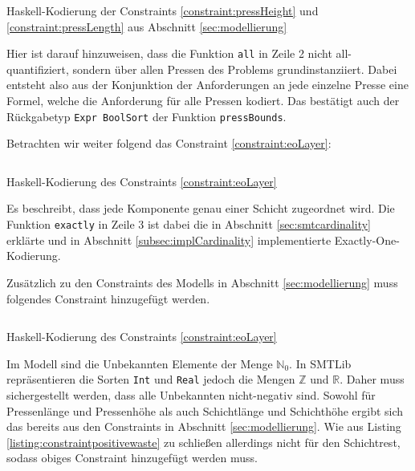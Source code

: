 \begin{listing}[H]
    \inputminted[linenos=true]{haskell}{Code/Implementierung/ConstraintPressenDimensionen.hs}
    \caption{Haskell-Kodierung der Constraints \ref{constraint:pressHeight} und \ref{constraint:pressLength} aus Abschnitt \ref{sec:modellierung}}
    \label{listing:constraintimplpressdim}
\end{listing}

Hier ist darauf hinzuweisen, dass die Funktion \texttt{all} in Zeile 2 nicht all-quantifiziert, sondern über allen Pressen des Problems grundinstanziiert.
Dabei entsteht also aus der Konjunktion der Anforderungen an jede einzelne Presse eine Formel, welche die Anforderung für alle Pressen kodiert.
Das bestätigt auch der Rückgabetyp \texttt{Expr BoolSort} der Funktion \texttt{pressBounds}.

Betrachten wir weiter folgend das Constraint \ref{constraint:eoLayer}:

\begin{listing}[H]
    \inputminted[linenos=true]{haskell}{Code/Implementierung/ConstraintCompInAmoLayer.hs}
    \caption{Haskell-Kodierung des Constraints \ref{constraint:eoLayer}}
    \label{listing:constraintimplamolayer}
\end{listing}

Es beschreibt, dass jede Komponente genau einer Schicht zugeordnet wird.
Die Funktion \texttt{exactly} in Zeile 3 ist dabei die in Abschnitt \ref{sec:smtcardinality} erklärte und in Abschnitt \ref{subsec:implCardinality} implementierte
Exactly-One-Kodierung.

Zusätzlich zu den Constraints des Modells in Abschnitt \ref{sec:modellierung} muss folgendes Constraint hinzugefügt werden.

\begin{listing}[H]
    \inputminted[linenos=true]{haskell}{Code/Implementierung/ConstraintCompInAmoLayer.hs}
    \caption{Haskell-Kodierung des Constraints \ref{constraint:eoLayer}}
    \label{listing:constraintpositivewaste}
\end{listing}

Im Modell sind die Unbekannten Elemente der Menge $\mathbb{N}_0$.
In SMTLib repräsentieren die Sorten \texttt{Int} und \texttt{Real} jedoch die Mengen $\mathbb{Z}$ und $\mathbb{R}$.
Daher muss sichergestellt werden, dass alle Unbekannten nicht-negativ sind.
Sowohl für Pressenlänge und Pressenhöhe als auch Schichtlänge und Schichthöhe ergibt sich das bereits aus den Constraints in Abschnitt \ref{sec:modellierung}.
Wie aus Listing \ref{listing:constraintpositivewaste} zu schließen allerdings nicht für den Schichtrest, sodass obiges Constraint hinzugefügt werden muss.

